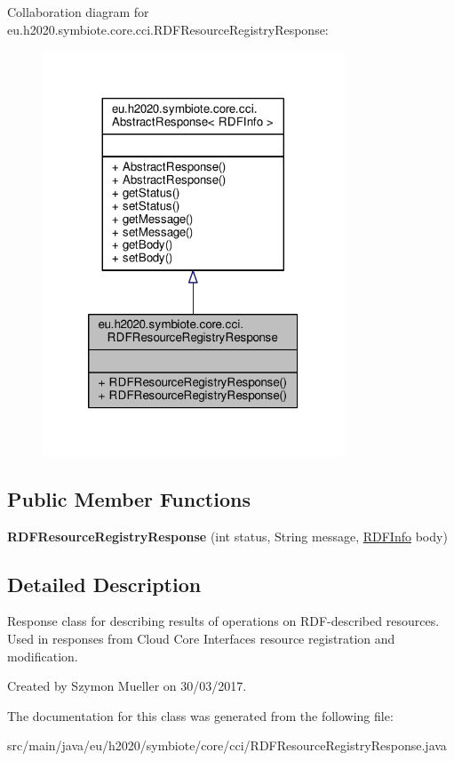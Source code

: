 Collaboration diagram for eu.\+h2020.\+symbiote.\+core.\+cci.\+R\+D\+F\+Resource\+Registry\+Response\+:\nopagebreak
\begin{figure}[H]
\begin{center}
\leavevmode
\includegraphics[width=254pt]{classeu_1_1h2020_1_1symbiote_1_1core_1_1cci_1_1RDFResourceRegistryResponse__coll__graph}
\end{center}
\end{figure}
\subsection*{Public Member Functions}
\begin{DoxyCompactItemize}
\item 
\mbox{\label{classeu_1_1h2020_1_1symbiote_1_1core_1_1cci_1_1RDFResourceRegistryResponse_af7be59e048d60044e9f5171074bc7a4b}} 
{\bfseries R\+D\+F\+Resource\+Registry\+Response} (int status, String message, \hyperlink{classeu_1_1h2020_1_1symbiote_1_1core_1_1internal_1_1RDFInfo}{R\+D\+F\+Info} body)
\end{DoxyCompactItemize}


\subsection{Detailed Description}
Response class for describing results of operations on R\+D\+F-\/described resources. Used in responses from Cloud Core Interface\textquotesingle{}s resource registration and modification. 

Created by Szymon Mueller on 30/03/2017. 

The documentation for this class was generated from the following file\+:\begin{DoxyCompactItemize}
\item 
src/main/java/eu/h2020/symbiote/core/cci/R\+D\+F\+Resource\+Registry\+Response.\+java\end{DoxyCompactItemize}
